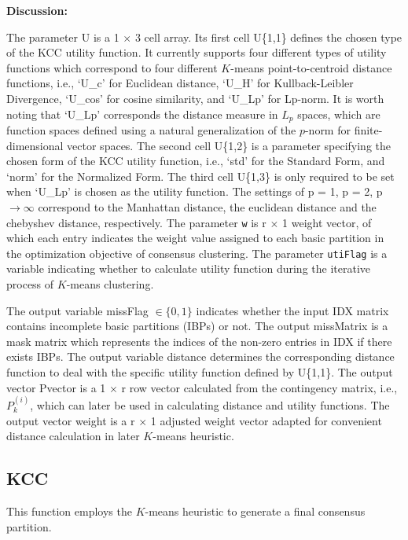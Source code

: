 \documentclass[10pt]{acmtrans2e}
\newenvironment{remark}
{\vspace*{0.1cm}
\noindent \textbf{Discussion:} \medskip

}
{
\vspace*{0.2cm}
}
\begin{document}
\begin{remark}
\noindent The parameter \textsf{U} is a \textsf{1} $\times$ \textsf{3} cell array. Its first cell \textsf{U\{1,1\}} defines the chosen type of the KCC utility function. It currently supports four different types of utility functions which correspond to four different $K$-means point-to-centroid distance functions, i.e., \textsf{`U\_c'} for Euclidean distance, \textsf{`U\_H'} for Kullback-Leibler Divergence, \textsf{`U\_cos'} for cosine similarity, and \textsf{`U\_Lp'} for Lp-norm. It is worth noting that \textsf{`U\_Lp'} corresponds the distance measure in $L_p$ spaces, which are function spaces defined using a natural generalization of the $p$-norm for finite-dimensional vector spaces. The second cell \textsf{U\{1,2\}} is a parameter specifying the chosen form of the KCC utility function, i.e., \textsf{`std'} for the Standard Form, and \textsf{`norm'} for the Normalized Form. The third cell \textsf{U\{1,3\}} is only required to be set when \textsf{`U\_Lp'} is chosen as the utility function. The settings of \textsf{p = 1}, \textsf{p = 2}, \textsf{p} $\rightarrow \infty$ correspond to the Manhattan distance, the euclidean distance and the chebyshev distance, respectively.  The parameter \texttt{w} is \textsf{r} $\times$ \textsf{1} weight vector, of which each entry indicates the weight value assigned to each basic partition in the optimization objective of consensus clustering. The parameter \texttt{utiFlag} is a variable indicating whether to calculate utility function during the iterative process of $K$-means clustering.

\noindent The output variable \textsf{missFlag} $\in \{0, 1\}$ indicates whether the input \textsf{IDX} matrix contains incomplete basic partitions (IBPs) or not. The output \textsf{missMatrix} is a mask matrix which represents the indices of the non-zero entries in \textsf{IDX} if there exists IBPs. The output variable \textsf{distance} determines the corresponding distance function to deal with the specific utility function defined by \textsf{U\{1,1\}}. The output vector \textsf{Pvector} is a \textsf{1} $\times$ \textsf{r} row vector calculated from the contingency matrix, i.e., $P^{(i)}_k$, which can later be used in calculating distance and utility functions. The output vector \textsf{weight} is a \textsf{r} $\times$ \textsf{1} adjusted weight vector adapted for convenient distance calculation in later $K$-means heuristic. 
\end{remark}

\subsection{KCC}
This function employs the $K$-means heuristic to generate a final consensus partition.
\end{document}
